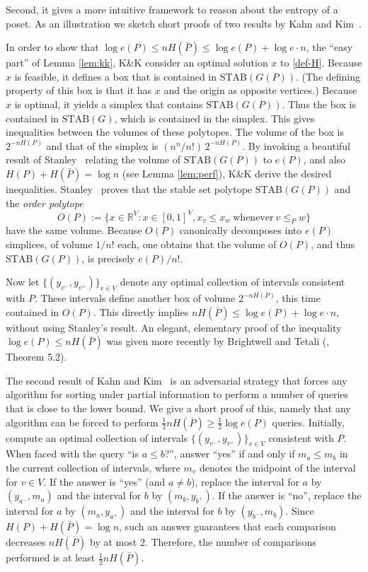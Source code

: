 \documentclass{article} \usepackage{fullpage}
\newcommand{\STAB}{\mathrm{STAB}}
\begin{document}
Second, it gives a more intuitive framework to reason about the entropy of a poset. As an illustration we sketch short proofs of two results by Kahn and Kim~\cite{KK95}.

In order to show that $\log e(P) \leq nH(\bar{P}) \leq \log e(P) + \log e \cdot n$, the ``easy part'' of Lemma \ref{lem:kk}, K\&K consider an optimal solution $x$ to \eqref{def-H}. Because $x$ is feasible, it defines a box that is contained in $\STAB(G(P))$. (The defining property of this box is that it has $x$ and the origin as opposite vertices.) Because $x$ is optimal, it yields a simplex that contains $\STAB(G(P))$. Thus the box is contained in $\STAB(G)$, which is contained in the simplex. This gives inequalities between the volumes of these polytopes. The volume of the box is $2^{-nH(P)}$ and that of the simplex is $(n^n/n!)\,2^{-nH(P)}$. By invoking a beautiful result of Stanley~\cite{S86} relating the volume of $\STAB(G(P))$ to $e(P)$, and also $H(P) + H(\bar{P}) = \log n$ (see Lemma \ref{lem:perf}), K\&K derive the desired inequalities. Stanley~\cite{S86} proves that the stable set polytope $\STAB(G(P))$ and the {\sl order polytope} 
$$
O(P) := \{x \in \mathbb{R}^V : x \in [0,1]^V, x_v \leq x_w\ \text{whenever}\ v \leqslant_P w\}
$$ have the same volume. Because $O(P)$ canonically decomposes into $e(P)$ simplices, of volume $1/n!$ each, one obtains that the volume of $O(P)$, and thus $\STAB(G(P))$, is precisely $e(P)/n!$.

Now let $\{(y_{v^-},y_{v^+})\}_{v \in V}$ denote any optimal collection of intervals consistent with $P$. These intervals define another box of volume $2^{-nH(P)}$, this time contained in $O(P)$. This directly implies $nH(\bar{P}) \leq \log e(P) + \log e \cdot n$, without using Stanley's result. An elegant, elementary proof of the inequality $\log e(P) \leq nH(\bar{P})$ was given more recently by Brightwell and Tetali (\cite{BT03}, Theorem 5.2).

The second result of Kahn and Kim~\cite{KK95} is an adversarial strategy that forces any algorithm for sorting under partial information to perform a number of queries that is close to the lower bound. We give a short proof of this, namely that any algorithm can be forced to perform $\frac{1}{2} nH(\bar{P}) \geq \frac{1}{2} \log e(P)$ queries. Initially, compute an optimal collection of intervals $\{(y_{v^-},y_{v^+})\}_{v \in V}$ consistent with $P$. When faced with the query ``is $a \leqslant b$?'', answer ``yes'' if and only if $m_a \leq m_b$ in the current collection of intervals, where $m_v$ denotes the midpoint of the interval for $v \in V$. If the answer is ``yes'' (and $a \neq b$), replace the interval for $a$ by $(y_{a^-},m_a)$ and the interval for $b$ by $(m_b,y_{b^+})$. If the answer is ``no'', replace the interval for $a$ by $(m_a,y_{a^+})$ and the interval for $b$ by $(y_{b^-},m_b)$. Since $H(P) + H(\bar{P}) = \log n$, such an answer guarantees that each comparison decreases $nH(\bar{P})$ by at most $2$. Therefore, the number of comparisons performed is at least $\frac{1}{2} nH(\bar{P})$.
\end{document}

